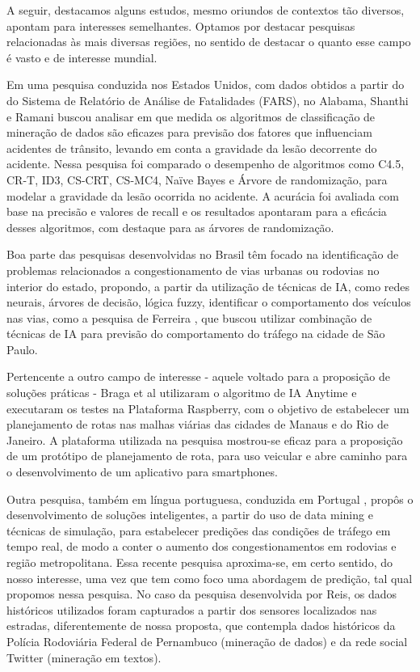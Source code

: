 A seguir, destacamos alguns estudos, mesmo oriundos de contextos tão diversos, apontam para interesses semelhantes. Optamos por destacar pesquisas relacionadas às mais diversas regiões, no sentido de destacar o quanto esse campo é vasto e de interesse mundial.

Em uma pesquisa conduzida nos Estados Unidos, com dados obtidos a partir do do Sistema de Relatório de Análise de Fatalidades (FARS), no Alabama, Shanthi e Ramani \cite{shanthi2012feature} buscou analisar em que medida os algoritmos de classificação de mineração de dados são eficazes para previsão dos fatores que influenciam acidentes de trânsito, levando em conta a gravidade da lesão decorrente do acidente. Nessa pesquisa foi comparado o desempenho de algoritmos como C4.5, CR-T, ID3, CS-CRT, CS-MC4, Naïve Bayes e Árvore de randomização, para modelar a gravidade da lesão ocorrida no acidente. A acurácia foi avaliada com base na precisão e valores de recall e os resultados apontaram para a eficácia desses algoritmos, com destaque para as árvores de randomização.

Boa parte das pesquisas desenvolvidas no Brasil têm focado na identificação de problemas relacionados a congestionamento de vias urbanas ou rodovias no interior do estado, propondo, a partir da utilização de técnicas de IA, como redes neurais, árvores de decisão, lógica fuzzy, identificar o comportamento dos veículos nas vias, como a pesquisa de Ferreira \cite{ferreira2011combinaccao}, que buscou utilizar combinação de técnicas de IA para previsão do comportamento do tráfego na cidade de São Paulo.

Pertencente a outro campo de interesse - aquele voltado para a proposição de soluções práticas - Braga et al \cite{braga2014planejamento} utilizaram o algoritmo de IA Anytime e executaram os testes na Plataforma Raspberry, com o objetivo de estabelecer um planejamento de rotas nas malhas viárias das cidades de Manaus e do Rio de Janeiro. A plataforma utilizada na pesquisa mostrou-se eficaz para a proposição de um protótipo de planejamento de rota, para uso veicular e abre caminho para o desenvolvimento de um aplicativo para smartphones.  

Outra pesquisa, também em língua portuguesa, conduzida em Portugal \cite{dos2016previsao}, propôs o desenvolvimento de soluções inteligentes, a partir do uso de data mining e técnicas de simulação, para estabelecer predições das condições de tráfego em tempo real, de modo a conter o aumento dos congestionamentos em rodovias e região metropolitana. Essa recente pesquisa aproxima-se, em certo sentido, do nosso interesse, uma vez que tem como foco uma abordagem de predição, tal qual propomos nessa pesquisa. No caso da pesquisa desenvolvida por Reis, os dados históricos utilizados foram capturados a partir dos sensores localizados nas estradas, diferentemente de nossa proposta, que contempla dados históricos da Polícia Rodoviária Federal de Pernambuco (mineração de dados) e da rede social Twitter (mineração em textos).

